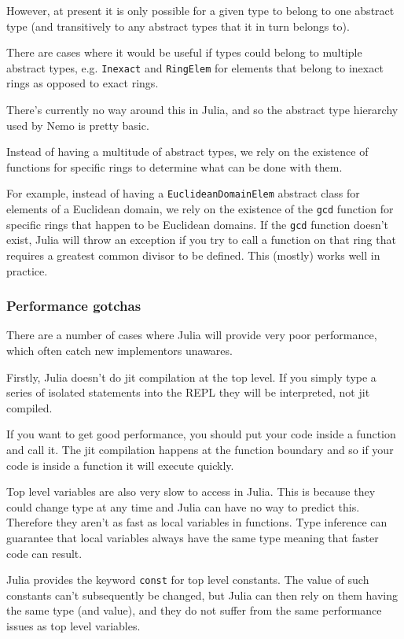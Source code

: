 \documentclass[a4paper,10pt]{article}
\newcommand{\code}{\lstinline}
\begin{document}
However, at present it is only possible for a given type to belong to one abstract type (and
transitively to any abstract types that it in turn belongs to).

There are cases where it would be useful if types could belong to multiple abstract types, e.g.
\code{Inexact} and \code{RingElem} for elements that belong to inexact rings as opposed to exact 
rings.

There's currently no way around this in Julia, and so the abstract type hierarchy used by Nemo is
pretty basic.

Instead of having a multitude of abstract types, we rely on the existence of functions for specific
rings to determine what can be done with them.

For example, instead of having a \code{EuclideanDomainElem} abstract class for elements of a Euclidean
domain, we rely on the existence of the \code{gcd} function for specific rings that happen to be
Euclidean domains. If the \code{gcd} function doesn't exist, Julia will throw an exception if you
try to call a function on that ring that requires a greatest common divisor to be defined. This 
(mostly) works well in practice.

\subsubsection{Performance gotchas}

There are a number of cases where Julia will provide very poor performance, which often catch new
implementors unawares.

Firstly, Julia doesn't do jit compilation at the top level. If you simply type a series of isolated
statements into the REPL they will be interpreted, not jit compiled.

If you want to get good performance, you should put your code inside a function and call it. The jit
compilation happens at the function boundary and so if your code is inside a function it will
execute quickly.

Top level variables are also very slow to access in Julia. This is because they could change type at
any time and Julia can have no way to predict this. Therefore they aren't as fast as local variables
in functions. Type inference can guarantee that local variables always have the same type meaning that
faster code can result.

Julia provides the keyword \code{const} for top level constants. The value of such constants can't
subsequently be changed, but Julia can then rely on them having the same type (and value), and they do
not suffer from the same performance issues as top level variables.
\end{document}
